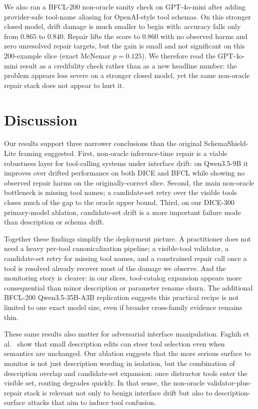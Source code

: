 \documentclass{svproc}
\newcommand{\method}{SchemaShield-Lite\xspace}
\begin{document}
We also ran a BFCL-200 non-oracle sanity check on GPT-4o-mini after adding
provider-safe tool-name aliasing for OpenAI-style tool schemas. On this stronger
closed model, drift damage is much smaller to begin with: accuracy falls only from
$0.865$ to $0.840$. Repair lifts the score to $0.860$ with no observed harms and
zero unresolved repair targets, but the gain is small and not significant on this
200-example slice (exact McNemar $p=0.125$). We therefore read the GPT-4o-mini
result as a credibility check rather than as a new headline number: the problem
appears less severe on a stronger closed model, yet the same non-oracle repair
stack does not appear to hurt it.

\section{Discussion}
Our results support three narrower conclusions than the original \method framing
suggested. First, non-oracle inference-time repair is a viable robustness layer for
tool-calling systems under interface drift: on Qwen3.5-9B it improves over drifted
performance on both DICE and BFCL while showing no observed repair harms on the
originally-correct slice. Second, the main non-oracle bottleneck is missing tool
names; a candidate-set retry over the visible tools closes much of the gap to the
oracle upper bound. Third, on our DICE-300 primary-model ablation, candidate-set
drift is a more important failure mode than description or schema drift.

Together these findings simplify the deployment picture. A practitioner does not
need a heavy per-tool canonicalization pipeline; a visible-tool validator, a
candidate-set retry for missing tool names, and a constrained repair call once a
tool is resolved already recover most of the damage we observe. And the monitoring
story is clearer: in our slices, tool-catalog expansion appears more consequential
than minor description or parameter rename churn. The additional BFCL-200
Qwen3.5-35B-A3B replication suggests this practical recipe is not limited to one
exact model size, even if broader cross-family evidence remains thin.

These same results also matter for adversarial interface manipulation. Faghih
et al.~\cite{faghih2025gaming} show that small description edits can steer tool
selection even when semantics are unchanged. Our ablation suggests that the more
serious surface to monitor is not just description wording in isolation, but the
combination of description overlap and candidate-set expansion: once distractor
tools enter the visible set, routing degrades quickly. In that sense, the
non-oracle validator-plus-repair stack is relevant not only to benign interface
drift but also to description-surface attacks that aim to induce tool confusion.
\end{document}
